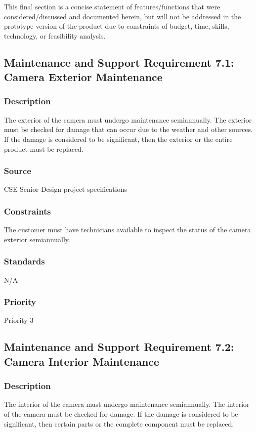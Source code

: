 This final section is a concise statement of features/functions that were considered/discussed and documented herein, but will not be addressed in the prototype version of the product due to constraints of budget, time, skills, technology, or feasibility analysis.

\subsection{Maintenance and Support Requirement 7.1: Camera Exterior Maintenance}
\subsubsection{Description}
The exterior of the camera must undergo maintenance semiannually. The exterior must be checked for damage that can occur due to the weather and other sources. If the damage is considered to be significant, then the exterior or the entire product must be replaced. 
\subsubsection{Source}
CSE Senior Design project specifications
\subsubsection{Constraints}
The customer must have technicians available to inspect the status of the camera exterior semiannually. 
\subsubsection{Standards}
N/A
\subsubsection{Priority}
Priority 3

\subsection{Maintenance and Support Requirement 7.2: Camera Interior Maintenance}
\subsubsection{Description}
The interior of the camera must undergo maintenance semiannually. The interior of the camera must be checked for damage. If the damage is considered to be significant, then certain parts or the complete component must be replaced. 
